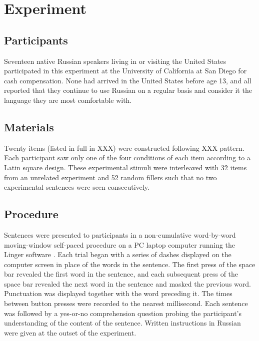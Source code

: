 \documentclass[12pt]{article}
\begin{document}



\section{Experiment}
\label{sec:experiment}

\subsection{Participants}

Seventeen native Russian speakers living in or visiting the United
States participated in this experiment at the University of California
at San Diego for cash compensation.  None had arrived in the United
States before age 13, and all reported that they continue to use
Russian on a regular basis and consider it the language they are most
comfortable with.

\subsection{Materials}


Twenty items (listed in full in XXX) were constructed following XXX
pattern.  Each participant saw only one of the four conditions of each
item according to a Latin square design.  These experimental stimuli
were interleaved with 32 items from an unrelated experiment and 52
random fillers such that no two experimental sentences were seen
consecutively.


\subsection{Procedure}
\label{sec:procedure}


Sentences were presented to participants in a non-cumulative
word-by-word moving-window self-paced procedure on a PC laptop
computer running the Linger software \citep{rohde:lingermanual}. Each
trial began with a series of dashes displayed on the computer screen
in place of the words in the sentence. The first press of the space
bar revealed the first word in the sentence, and each subsequent press
of the space bar revealed the next word in the sentence and masked the
previous word. Punctuation was displayed together with the word
preceding it.  The times between button presses were recorded to the
nearest millisecond.  Each sentence was followed by a yes-or-no
comprehension question probing the participant's understanding of the
content of the sentence.  Written instructions in Russian were given
at the outset of the experiment.
\end{document}
